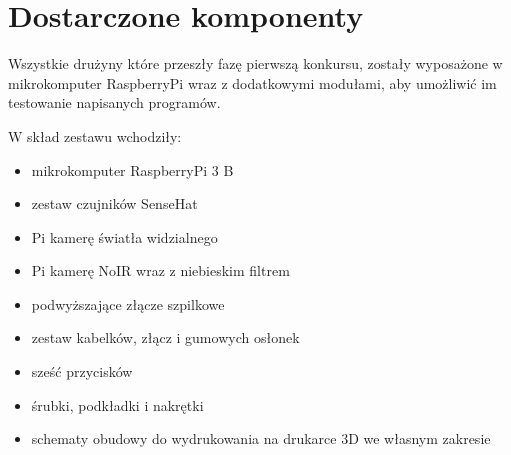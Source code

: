 \section{Dostarczone komponenty}\label{sec:cover_introduction}

Wszystkie drużyny które przeszły fazę pierwszą konkursu, zostały wyposażone
w mikrokomputer RaspberryPi wraz z dodatkowymi modułami, aby umożliwić im
testowanie napisanych programów.

W skład zestawu wchodziły:
\begin{itemize}
    \item mikrokomputer RaspberryPi 3 B
    \item zestaw czujników SenseHat
    \item Pi kamerę światła widzialnego
    \item Pi kamerę NoIR wraz z niebieskim filtrem
    \item podwyższające złącze szpilkowe
    \item zestaw kabelków, złącz i gumowych osłonek
    \item sześć przycisków
    \item śrubki, podkładki i nakrętki
    \item schematy obudowy do wydrukowania na drukarce 3D we własnym zakresie
\end{itemize}

